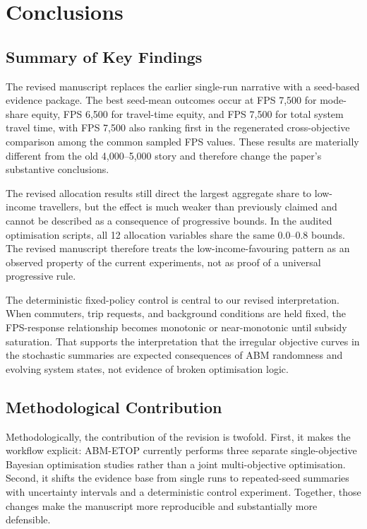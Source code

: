 \documentclass[a4paper,fleqn]{cas-sc}
\begin{document}
\section{Conclusions}\label{sec:conclusions}

\subsection{Summary of Key Findings}
The revised manuscript replaces the earlier single-run narrative with a seed-based evidence package. The best seed-mean outcomes occur at FPS 7,500 for mode-share equity, FPS 6,500 for travel-time equity, and FPS 7,500 for total system travel time, with FPS 7,500 also ranking first in the regenerated cross-objective comparison among the common sampled FPS values. These results are materially different from the old 4,000--5,000 story and therefore change the paper's substantive conclusions.

The revised allocation results still direct the largest aggregate share to low-income travellers, but the effect is much weaker than previously claimed and cannot be described as a consequence of progressive bounds. In the audited optimisation scripts, all 12 allocation variables share the same 0.0--0.8 bounds. The revised manuscript therefore treats the low-income-favouring pattern as an observed property of the current experiments, not as proof of a universal progressive rule.

The deterministic fixed-policy control is central to our revised interpretation. When commuters, trip requests, and background conditions are held fixed, the FPS-response relationship becomes monotonic or near-monotonic until subsidy saturation. That supports the interpretation that the irregular objective curves in the stochastic summaries are expected consequences of ABM randomness and evolving system states, not evidence of broken optimisation logic.

\subsection{Methodological Contribution}
Methodologically, the contribution of the revision is twofold. First, it makes the workflow explicit: ABM-ETOP currently performs three separate single-objective Bayesian optimisation studies rather than a joint multi-objective optimisation. Second, it shifts the evidence base from single runs to repeated-seed summaries with uncertainty intervals and a deterministic control experiment. Together, those changes make the manuscript more reproducible and substantially more defensible.
\end{document}
